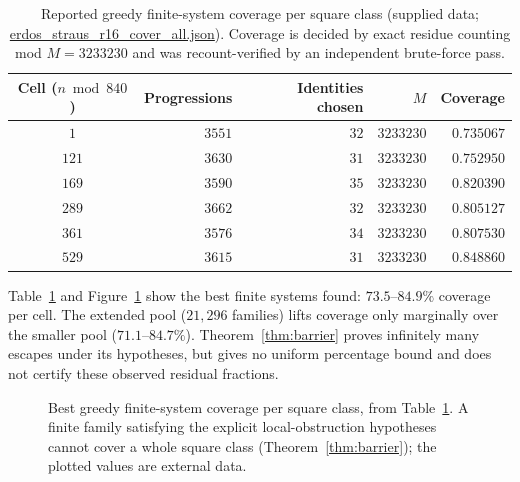 \documentclass[11pt,a4paper]{article}
\theoremstyle{definition}
\begin{document}
\begin{table}[t]
  \centering
  \begin{tabular}{crrrr}
    \toprule
    Cell ($n \bmod 840$) & Progressions & Identities chosen & $M$ &
      Coverage \\
    \midrule
    $1$   & $3551$ & $32$ & $3233230$ & $0.735067$ \\
    $121$ & $3630$ & $31$ & $3233230$ & $0.752950$ \\
    $169$ & $3590$ & $35$ & $3233230$ & $0.820390$ \\
    $289$ & $3662$ & $32$ & $3233230$ & $0.805127$ \\
    $361$ & $3576$ & $34$ & $3233230$ & $0.807530$ \\
    $529$ & $3615$ & $31$ & $3233230$ & $0.848860$ \\
    \bottomrule
  \end{tabular}
  \caption{Reported greedy finite-system coverage per square class
    (supplied data; \url{erdos_straus_r16_cover_all.json}).
    Coverage is decided by exact residue counting mod
    $M = 3233230$ and was recount-verified by an independent
    brute-force pass.}
  \label{tab:coverage}
\end{table}

Table~\ref{tab:coverage} and Figure~\ref{fig:coveragebars} show the best
finite systems found: $73.5$--$84.9\%$ coverage per cell. The extended
pool ($21{,}296$ families) lifts coverage only marginally over the
smaller pool ($71.1$--$84.7\%$). Theorem~\ref{thm:barrier} proves
infinitely many escapes under its hypotheses, but gives no uniform
percentage bound and does not certify these observed residual fractions.

\begin{figure}[t]
  \centering
  \caption{Best greedy finite-system coverage per square class, from
    Table~\ref{tab:coverage}. A finite family satisfying the explicit
    local-obstruction hypotheses cannot cover a whole square class
    (Theorem~\ref{thm:barrier}); the plotted values are external data.}
  \label{fig:coveragebars}
\end{figure}
\end{document}
